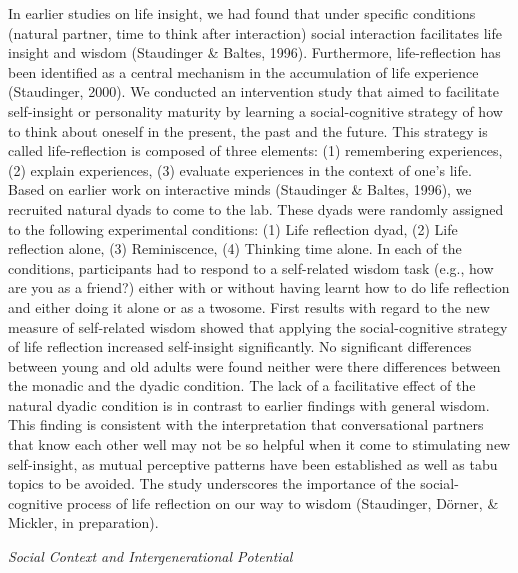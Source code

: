 In earlier studies on life insight, we had found that under specific conditions (natural partner, time to think after interaction) social interaction facilitates life insight and wisdom (Staudinger \& Baltes, 1996). Furthermore, life-reflection has been identified as a central mechanism in the accumulation of life experience (Staudinger, 2000). We conducted an intervention study that aimed to facilitate self-insight or personality maturity by learning a social-cognitive strategy of how to think about oneself in the present, the past and the future. This strategy is called life-reflection is composed of three elements: (1) remembering experiences, (2) explain experiences, (3) evaluate experiences in the context of one's life. Based on earlier work on interactive minds (Staudinger \& Baltes, 1996), we recruited natural dyads to come to the lab. These dyads were randomly assigned to the following experimental conditions: (1) Life reflection dyad, (2) Life reflection alone, (3) Reminiscence, (4) Thinking time alone. In each of the conditions, participants had to respond to a self-related wisdom task (e.g., how are you as a friend?) either with or without having learnt how to do life reflection and either doing it alone or as a twosome. First results with regard to the new measure of self-related wisdom showed that applying the social-cognitive strategy of life reflection increased self-insight significantly. No significant differences between young and old adults were found neither were there differences between the monadic and the dyadic condition. The lack of a facilitative effect of the natural dyadic condition is in contrast to earlier findings with general wisdom. This finding is consistent with the interpretation that conversational partners that know each other well may not be so helpful when it come to stimulating new self-insight, as mutual perceptive patterns have been established as well as tabu topics to be avoided. The study underscores the importance of the social-cognitive process of life reflection on our way to wisdom (Staudinger, D\"orner, \& Mickler, in preparation).

\textit{Social Context and Intergenerational Potential}

